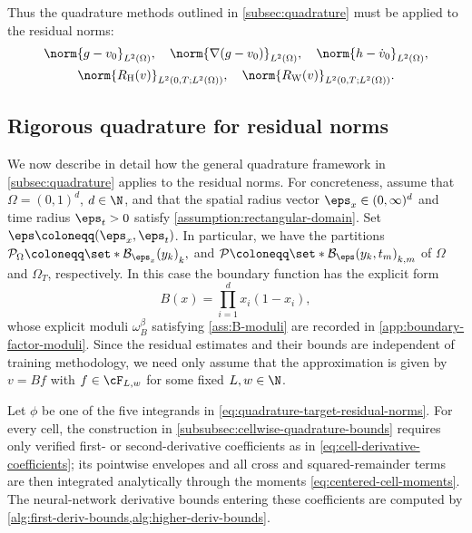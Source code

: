 Thus the quadrature methods outlined in \cref{subsec:quadrature} must be applied to the residual norms:
\begin{equation}\label{eq:quadrature-target-residual-norms}
\begin{gathered}
    \norm{g-v_0}_{L^2(\Omega)},
    \quad
    \norm{\nabla(g-v_0)}_{L^2(\Omega)},
    \quad
    \norm{h-\dot v_0}_{L^2(\Omega)},
    \\
    \norm{R_{\mathrm H}(v)}_{L^2(0,T;L^2(\Omega))},
    \quad
    \norm{R_{\mathrm W}(v)}_{L^2(0,T;L^2(\Omega))}.
\end{gathered}
\end{equation}


\subsection{Rigorous quadrature for residual norms}\label{sec:residual-quad}
We now describe in detail how the general quadrature framework in \cref{subsec:quadrature} applies to the residual norms.
For concreteness, assume that \(\Omega=(0,1)^d\), $d\in\N$, and that the spatial radius vector $\boldsymbol{\eps}_x\in(0,\infty)^d$ and time radius $\eps_t>0$ satisfy \cref{assumption:rectangular-domain}.  Set $\boldsymbol{\eps}\coloneqq(\boldsymbol{\eps}_x,\eps_t)$.  In particular, we have the partitions
 \(
    \mathcal P_\Omega
    \coloneqq
    \set*{\mathcal B_{\boldsymbol{\eps}_x}(y_k)}_k,
  \) and
  \(  \mathcal P
    \coloneqq
    \set*{\mathcal B_{\boldsymbol{\eps}}(y_k,t_m)}_{k,m}
  \)
  of $\Omega$ and $\Omega_T$, respectively.
In this case the boundary function has the explicit form
\[
B(x) = \prod_{i=1}^d x_i(1-x_i),
\]
whose explicit moduli $\omega_B^\beta$ satisfying \cref{ass:B-moduli} are recorded in
\cref{app:boundary-factor-moduli}. Since the residual estimates and their bounds are independent of training methodology, we need only assume that the approximation is given by $v = Bf$ with $f \in \cF_{L, w}$ for some fixed $L, w \in \N$.




Let $\phi$ be one of the five integrands in
\eqref{eq:quadrature-target-residual-norms}.  For every cell, the construction
in \cref{subsubsec:cellwise-quadrature-bounds} requires only verified first-
or second-derivative coefficients as in
\eqref{eq:cell-derivative-coefficients}; its pointwise envelopes and all
cross and squared-remainder terms are then integrated analytically through
the moments \eqref{eq:centered-cell-moments}.  The neural-network derivative
bounds entering these coefficients are computed by
\cref{alg:first-deriv-bounds,alg:higher-deriv-bounds}.

